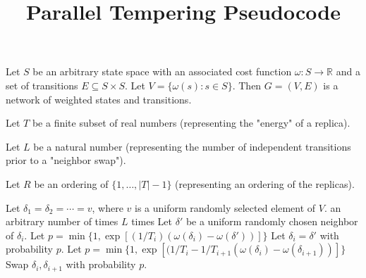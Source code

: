 \documentclass[11pt]{article}
\title{Parallel Tempering Pseudocode}
\author{}
\date{}
\def\R{\mathbb R}
\begin{document}
\maketitle

Let $S$ be an arbitrary state space with an associated cost function $\omega\colon S\rightarrow\R$ and a set of transitions $E \subseteq S\times S$. Let $V = \{ \omega(s) \colon s\in S\}$. Then $G=(V,E)$ is a network of weighted states and transitions.

Let $T$ be a finite subset of real numbers (representing the "energy" of a replica).

Let $L$ be a natural number (representing the number of independent transitions prior to a "neighbor swap").

Let $R$ be an ordering of $\{ 1, \ldots, |T| - 1\}$ (representing an ordering of the replicas).

\vspace{1cm}

\begin{algorithmic}
\State Let $\delta_1 =  \delta_2 = \cdots = v$, where $v$ is a uniform randomly selected element of $V$.
\Loop \;an arbitrary number of times
		\Loop \;$L$ times
			\State Let $\delta'$ be a uniform randomly chosen neighbor of $\delta_i$.
			\State Let $p = \min\{1, \exp\left[ (1/T_i) (\omega(\delta_i) - \omega(\delta')) \right] \}$
			\State Let $\delta_i = \delta'$ with probability $p$.
		\EndLoop
	\EndFor
	\State
		\State Let $p = \min\{1, \exp\left[ (1/T_i -1/T_{i+1} (\omega(\delta_i) - \omega(\delta_{i+1})) \right] \}$
		\State Swap $\delta_i, \delta_{i+1}$ with probability $p$.
	\EndFor
\EndLoop
				
\end{algorithmic}
\end{document}
